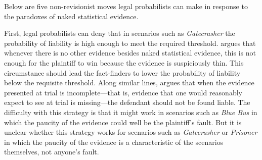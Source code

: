 \documentclass{article}
\begin{document}

Below are five non-revisionist moves legal probabilists can make in response to the paradoxes of naked statistical evidence.  


First, legal probabilists can deny that in scenarios such as \textit{Gatecrasher} the probability of liability is high enough to meet the required threshold. \citet{kaye1979probability}
argues that whenever there is no other evidence besides naked statistical evidence, this is not enough 
for the plaintiff to win because the evidence is suspiciously thin. This circumstance should lead the fact-finders to lower the probability of liability below the requisite threshold.  
Along similar lines, \cite{nance2016}  argues that when the evidence presented at trial is incomplete---that is,  evidence that one would reasonably expect to see at trial is missing---the defendant should not be found liable. 
The difficulty with this strategy is that it might work in scenarios such as \textit{Blue Bus} in which the paucity of the evidence could well be the plaintiff's fault. But it is unclear whether this strategy works for scenarios such as \textit{Gatecrasher} or \textit{Prisoner} in which 
the paucity of the evidence is a characteristic 
of the scenarios themselves, not anyone's fault.  
\end{document}
